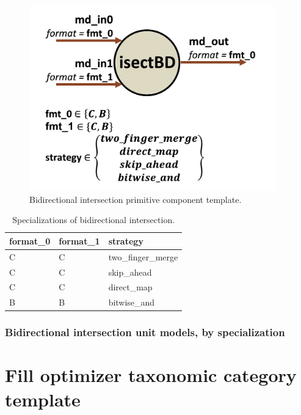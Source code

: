 \begin{figure}[H]
    \centering
    \includegraphics[width=0.95\textwidth]{figures/isectbd.png}
    \caption{Bidirectional intersection primitive component template.}
    \label{fig:isectbd}
\end{figure}

\begin{table}[H]
\centering
\begin{tabular}{lll}
\toprule
 format\_0   & format\_1   & strategy         \\
\midrule
 C          & C          & two\_finger\_merge \\
 C          & C          & skip\_ahead       \\
 C          & C          & direct\_map       \\
 B          & B          & bitwise\_and      \\
\bottomrule
\end{tabular}
\caption{Specializations of bidirectional intersection.}
\label{tab:IntersectionBidirectional_specializations}
\end{table}

\subsubsection{Bidirectional intersection unit models, by specialization}

\section{Fill optimizer taxonomic category template}

